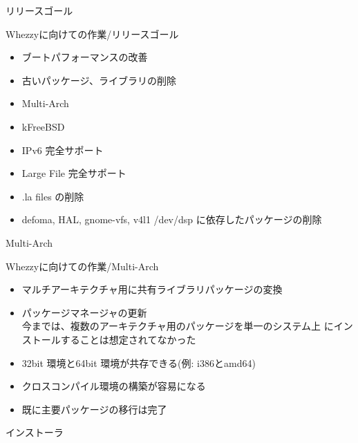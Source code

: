 
\begin{frame}
\begin{center}
\LARGE{リリースゴール}
\end{center}
\end{frame}

\begin{frame}{Whezzyに向けての作業/リリースゴール}
\begin{itemize}
\item ブートパフォーマンスの改善
\item 古いパッケージ、ライブラリの削除
\item Multi-Arch
\item kFreeBSD
\item IPv6 完全サポート
\item Large File 完全サポート
\item .la files の削除
\item defoma, HAL, gnome-vfs, v4l1 /dev/dsp に依存したパッケージの削除

\end{itemize}
\end{frame}

\begin{frame}
\begin{center}
\LARGE{Multi-Arch}
\end{center}
\end{frame}

\begin{frame}{Whezzyに向けての作業/Multi-Arch}
\begin{itemize}
\item マルチアーキテクチャ用に共有ライブラリパッケージの変換
\item パッケージマネージャの更新\\
今までは、複数のアーキテクチャ用のパッケージを単一のシステム上
にインストールすることは想定されてなかった
\item 32bit 環境と64bit 環境が共存できる(例: i386とamd64)
\item クロスコンパイル環境の構築が容易になる
\item 既に主要パッケージの移行は完了
\end{itemize}
\end{frame}

\begin{frame}
\begin{center}
\LARGE{インストーラ}
\end{center}
\end{frame}

